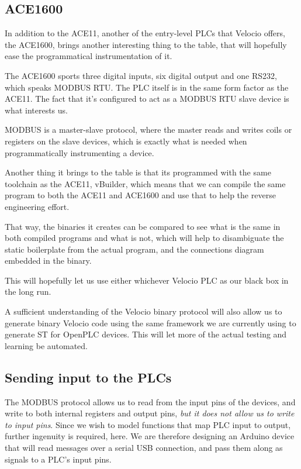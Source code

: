 \documentclass[11pt]{article}
\begin{document}
\subsection{ACE1600}
\label{sec:org8cd702e}

In addition to the ACE11, another of the entry-level PLCs that Velocio offers, the ACE1600, brings another interesting thing to the table, that will hopefully ease the programmatical instrumentation of it.

The ACE1600 sports three digital inputs, six digital output and one RS232, which speaks MODBUS RTU. The PLC itself is in the same form factor as the ACE11. The fact that it's configured to act as a MODBUS RTU slave device is what interests us.

MODBUS is a master-slave protocol, where the master reads and writes coils or registers on the slave devices, which is exactly what is needed when programmatically instrumenting a device.

Another thing it brings to the table is that its programmed with the same toolchain as the ACE11, vBuilder, which means that we can compile the same program to both the ACE11 and ACE1600 and use that to help the reverse engineering effort.

That way, the binaries it creates can be compared to see what is the same in both compiled programs and what is not, which will help to disambiguate the static boilerplate from the actual program, and the connections diagram embedded in the binary.

This will hopefully let us use either whichever Velocio PLC as our black box in the long run.

A sufficient understanding of the Velocio binary protocol will also allow us to generate binary Velocio code using the same framework we are currently using to generate ST for OpenPLC devices. This will let more of the actual testing and learning be automated.




\subsection{Sending input to the PLCs}
\label{sec:org46c3c90}

The MODBUS protocol allows us to read from the input pins of the devices, and write to both internal registers and output pins, \emph{but it does not allow us to write to input pins}. Since we wish to model functions that map PLC input to output, further ingenuity is required, here. We are therefore designing an Arduino device that will read messages over a serial USB connection, and pass them along as signals to a PLC's input pins. 
\end{document}
